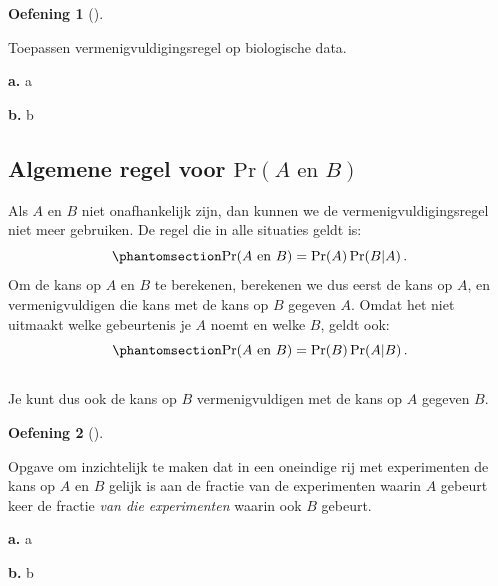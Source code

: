\documentclass[
  a4paper,
]{scrbook}
\theoremstyle{definition}
\newtheorem{exercise}{Oefening}[chapter]
\theoremstyle{definition}
\theoremstyle{remark}
\begin{document}
\begin{exercise}[]\protect\hypertarget{exr-vermenigingsregel-intuitie}{}\label{exr-vermenigingsregel-intuitie}

Toepassen vermenigvuldigingsregel op biologische data.

\textbf{a.} a

\textbf{b.} b

\end{exercise}

\subsection{\texorpdfstring{Algemene regel voor
\(\textrm{Pr}\!\left(A \textrm{ en } B\right)\)}{Algemene regel voor \textbackslash textrm\{Pr\}\textbackslash!\textbackslash left(A \textbackslash textrm\{ en \} B\textbackslash right)}}\label{algemene-regel-voor-textrmprlefta-textrm-en-bright}

Als \(A\) en \(B\) niet onafhankelijk zijn, dan kunnen we de
vermenigvuldigingsregel niet meer gebruiken. De regel die in alle
situaties geldt is:
\begin{equation}\phantomsection\label{eq-AenBalgemeen1}{ 
\textrm{Pr}\!\left(A \textrm{ en } B\right) = \textrm{Pr}\!\left(A\right)\textrm{Pr}\!\left(B | A\right).  
}\end{equation} Om de kans op \(A\) en \(B\) te berekenen, berekenen we
dus eerst de kans op \(A\), en vermenigvuldigen die kans met de kans op
\(B\) gegeven \(A\). Omdat het niet uitmaakt welke gebeurtenis je \(A\)
noemt en welke \(B\), geldt ook:
\begin{equation}\phantomsection\label{eq-AenBalgemeen2}{
\textrm{Pr}\!\left(A \textrm{ en } B\right) = \textrm{Pr}\!\left(B\right)\textrm{Pr}\!\left(A | B\right).  
}\end{equation}\\
Je kunt dus ook de kans op \(B\) vermenigvuldigen met de kans op \(A\)
gegeven \(B\).

\begin{exercise}[]\protect\hypertarget{exr-oneindig}{}\label{exr-oneindig}

Opgave om inzichtelijk te maken dat in een oneindige rij met
experimenten de kans op \(A\) en \(B\) gelijk is aan de fractie van de
experimenten waarin \(A\) gebeurt keer de fractie \emph{van die
experimenten} waarin ook \(B\) gebeurt.

\textbf{a.} a

\textbf{b.} b

\end{exercise}
\end{document}
